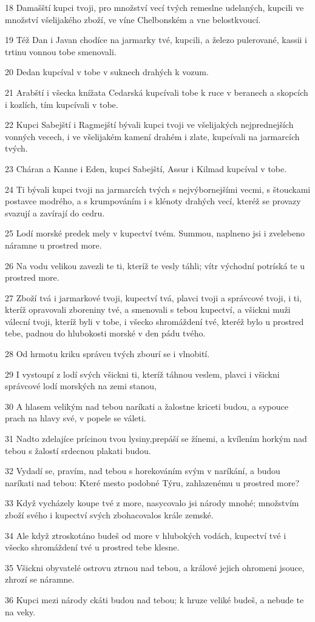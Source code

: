 \par 18 Damašští kupci tvoji, pro množství vecí tvých remeslne udelaných, kupcili ve množství všelijakého zboží, ve víne Chelbonském a vne belostkvoucí.
\par 19 Též Dan i Javan chodíce na jarmarky tvé, kupcili, a železo pulerované, kassii i trtinu vonnou tobe smenovali.
\par 20 Dedan kupcíval v tobe v suknech drahých k vozum.
\par 21 Arabští i všecka knížata Cedarská kupcívali tobe k ruce v beranech a skopcích i kozlích, tím kupcívali v tobe.
\par 22 Kupci Sabejští i Ragmejští bývali kupci tvoji ve všelijakých nejprednejších vonných vecech, i ve všelijakém kamení drahém i zlate, kupcívali na jarmarcích tvých.
\par 23 Cháran a Kanne i Eden, kupci Sabejští, Assur i Kilmad kupcíval v tobe.
\par 24 Ti bývali kupci tvoji na jarmarcích tvých s nejvýbornejšími vecmi, s štouckami postavce modrého, a s krumpováním i s klénoty drahých vecí, kteréž se provazy svazují a zavírají do cedru.
\par 25 Lodí morské predek mely v kupectví tvém. Summou, naplneno jsi i zvelebeno náramne u prostred more.
\par 26 Na vodu velikou zavezli te ti, kteríž te vesly táhli; vítr východní potríská te u prostred more.
\par 27 Zboží tvá i jarmarkové tvoji, kupectví tvá, plavci tvoji a správcové tvoji, i ti, kteríž opravovali zboreniny tvé, a smenovali s tebou kupectví, a všickni muži válecní tvoji, kteríž byli v tobe, i všecko shromáždení tvé, kteréž bylo u prostred tebe, padnou do hlubokosti morské v den pádu tvého.
\par 28 Od hrmotu kriku správcu tvých zbourí se i vlnobití.
\par 29 I vystoupí z lodí svých všickni ti, kteríž táhnou veslem, plavci i všickni správcové lodí morských na zemi stanou,
\par 30 A hlasem velikým nad tebou naríkati a žalostne kriceti budou, a sypouce prach na hlavy své, v popele se váleti.
\par 31 Nadto zdelajíce prícinou tvou lysiny,prepáší se žínemi, a kvílením horkým nad tebou s žalostí srdecnou plakati budou.
\par 32 Vydadí se, pravím, nad tebou s horekováním svým v naríkání, a budou naríkati nad tebou: Které mesto podobné Týru, zahlazenému u prostred more?
\par 33 Když vycházely koupe tvé z more, nasycovalo jsi národy mnohé; množstvím zboží svého i kupectví svých zbohacovalos krále zemské.
\par 34 Ale když ztroskotáno budeš od more v hlubokých vodách, kupectví tvé i všecko shromáždení tvé u prostred tebe klesne.
\par 35 Všickni obyvatelé ostrovu ztrnou nad tebou, a králové jejich ohromeni jsouce, zhrozí se náramne.
\par 36 Kupci mezi národy ckáti budou nad tebou; k hruze veliké budeš, a nebude te na veky.

